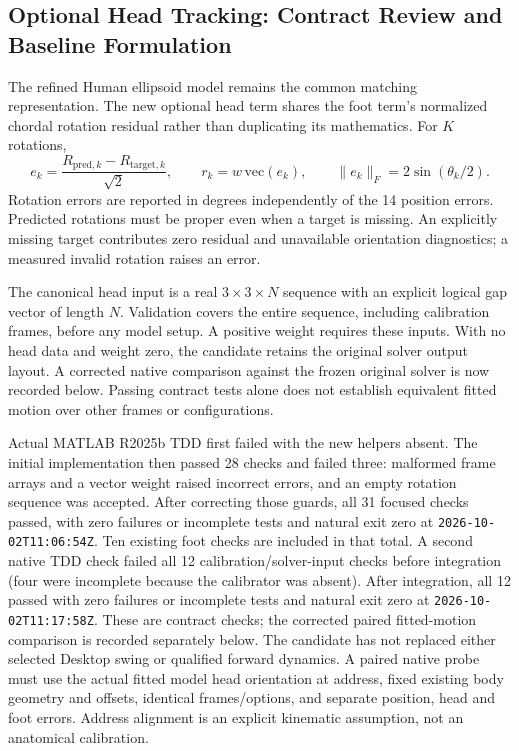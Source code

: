 \documentclass[11pt,a4paper]{article}
\begin{document}
\subsection{Optional Head Tracking: Contract Review and Baseline Formulation}
The refined Human ellipsoid model remains the common matching representation.
The new optional head term shares the foot term's normalized chordal rotation
residual rather than duplicating its mathematics. For $K$ rotations,
\[
 e_k=\frac{R_{\mathrm{pred},k}-R_{\mathrm{target},k}}{\sqrt{2}},
 \qquad r_k=w\,\mathrm{vec}(e_k),
 \qquad \|e_k\|_F=2\sin(\theta_k/2).
\]
Rotation errors are reported in degrees independently of the 14 position
errors. Predicted rotations must be proper even when a target is missing.
An explicitly missing target contributes zero residual and unavailable
orientation diagnostics; a measured invalid rotation raises an error.

The canonical head input is a real $3\times3\times N$ sequence with an explicit
logical gap vector of length $N$. Validation covers the entire sequence,
including calibration frames, before any model setup. A positive weight
requires these inputs. With no head data and weight zero, the candidate
retains the original solver output layout. A corrected native comparison against the frozen original solver is now
recorded below. Passing contract tests alone does not establish equivalent
fitted motion over other frames or configurations.

Actual MATLAB R2025b TDD first failed with the new helpers absent. The initial
implementation then passed 28 checks and failed three: malformed frame arrays
and a vector weight raised incorrect errors, and an empty rotation sequence
was accepted. After correcting those guards, all 31 focused checks passed,
with zero failures or incomplete tests and natural exit zero at
\texttt{2026-10-02T11:06:54Z}. Ten existing foot checks are included in that
total. A second native TDD check failed all 12 calibration/solver-input checks before
integration (four were incomplete because the calibrator was absent). After
integration, all 12 passed with zero failures or incomplete tests and natural
exit zero at \texttt{2026-10-02T11:17:58Z}. These are contract checks; the corrected paired fitted-motion comparison
is recorded separately below. The candidate
has not replaced either selected Desktop swing or qualified forward dynamics.
A paired native probe must use the actual fitted model head orientation at
address, fixed existing body geometry and offsets, identical frames/options,
and separate position, head and foot errors. Address alignment is an explicit
kinematic assumption, not an anatomical calibration.
\end{document}
